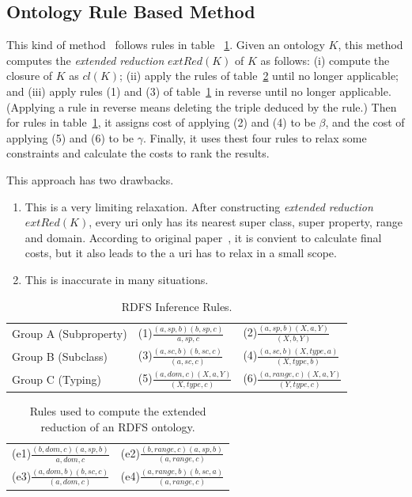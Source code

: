 \documentclass[runningheads]{llncs}
\begin{document}
\subsection{Ontology Rule Based Method}
This kind of method~\cite{2010combining} follows rules in table ~\ref{RDFS_rules}. Given an ontology $K$, this method computes the \textit{extended reduction} $extRed(K)$ of $K$ as follows: (i) compute the closure of $K$ as $cl(K)$; (ii) apply the rules of table~\ref{reduction_rdfs_rules} until no longer applicable; and (iii) apply rules (1) and (3) of table~\ref{RDFS_rules} in reverse until no longer applicable. (Applying a rule in reverse means deleting the triple deduced by the rule.) Then for rules in table~\ref{RDFS_rules}, it assigns cost of applying (2) and (4) to be $\beta$, and the cost of applying (5) and (6) to be $\gamma$. Finally, it uses thest four rules to relax some constraints and calculate the costs to rank the results.

This approach has two drawbacks.
\begin{enumerate}
  \item This is a very limiting relaxation. After constructing \textit{extended reduction} $extRed(K)$, every uri only has its nearest super class, super property, range and domain. According to original paper~\cite{2010combining}, it is convient to calculate final costs, but it also leads to the a uri has to relax in a small scope.
  \item This is inaccurate in many situations.
\end{enumerate}

\begin{table}
\caption{RDFS Inference Rules.}\label{RDFS_rules}
\centering
\begin{tabular}{|lll|}
\hline
Group A (Subproperty) &  (1)$\frac{(a,sp,b)(b,sp,c)}{a,sp,c}$ & (2)$\frac{(a,sp,b)(X,a,Y)}{(X,b,Y)}$\\
Group B (Subclass) & (3)$\frac{(a,sc,b)(b,sc,c)}{(a,sc,c)}$ & (4)$\frac{(a,sc,b)(X,type,a)}{(X,type,b)}$\\
Group C (Typing) & (5)$\frac{(a,dom,c)(X,a,Y)}{(X,type,c)}$ & (6)$\frac{(a,range,c)(X,a,Y)}{(Y,type,c)}$ \\
\hline
\end{tabular}
\end{table}

\begin{table}
\caption{Rules used to compute the extended reduction of an RDFS ontology.}\label{reduction_rdfs_rules}
\centering
\begin{tabular}{|ll|}
\hline
(e1)$\frac{(b,dom,c)(a,sp,b)}{a,dom,c}$ & (e2)$\frac{(b,range,c)(a,sp,b)}{(a,range,c)}$\\
(e3)$\frac{(a,dom,b)(b,sc,c)}{(a,dom,c)}$ & (e4)$\frac{(a,range,b)(b,sc,a)}{(a,range,c)}$\\
\hline
\end{tabular}
\end{table}
\end{document}
